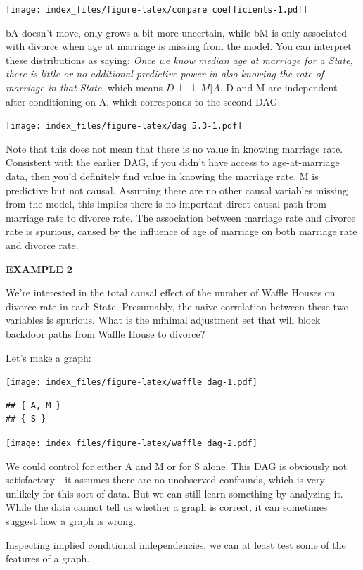 \documentclass[
]{article}
\begin{document}
\texttt{[image: index\_files/figure-latex/compare coefficients-1.pdf]}

bA doesn't move, only grows a bit more uncertain, while bM is only
associated with divorce when age at marriage is missing from the model.
You can interpret these distributions as saying: \emph{Once we know
median age at marriage for a State, there is little or no additional
predictive power in also knowing the rate of marriage in that State},
which means \(D \!\perp\!\!\!\perp M|A\). D and M are independent after
conditioning on A, which corresponds to the second DAG.

\texttt{[image: index\_files/figure-latex/dag 5.3-1.pdf]}

Note that this does not mean that there is no value in knowing marriage
rate. Consistent with the earlier DAG, if you didn't have access to
age-at-marriage data, then you'd definitely find value in knowing the
marriage rate. M is predictive but not causal. Assuming there are no
other causal variables missing from the model, this implies there is no
important direct causal path from marriage rate to divorce rate. The
association between marriage rate and divorce rate is spurious, caused
by the influence of age of marriage on both marriage rate and divorce
rate.

\textbf{EXAMPLE 2}

We're interested in the total causal effect of the number of Waffle
Houses on divorce rate in each State. Presumably, the naive correlation
between these two variables is spurious. What is the minimal adjustment
set that will block backdoor paths from Waffle House to divorce?

Let's make a graph:

\texttt{[image: index\_files/figure-latex/waffle dag-1.pdf]}

\begin{verbatim}
## { A, M }
## { S }
\end{verbatim}

\texttt{[image: index\_files/figure-latex/waffle dag-2.pdf]}

We could control for either A and M or for S alone. This DAG is
obviously not satisfactory---it assumes there are no unobserved
confounds, which is very unlikely for this sort of data. But we can
still learn something by analyzing it. While the data cannot tell us
whether a graph is correct, it can sometimes suggest how a graph is
wrong.

Inspecting implied conditional independencies, we can at least test some
of the features of a graph.
\end{document}
